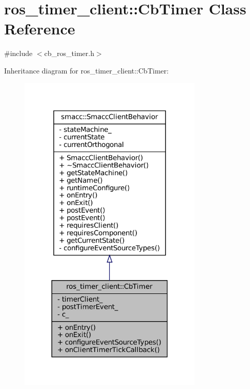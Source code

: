\hypertarget{classros__timer__client_1_1CbTimer}{}\section{ros\+\_\+timer\+\_\+client\+:\+:Cb\+Timer Class Reference}
\label{classros__timer__client_1_1CbTimer}


{\ttfamily \#include $<$cb\+\_\+ros\+\_\+timer.\+h$>$}



Inheritance diagram for ros\+\_\+timer\+\_\+client\+:\+:Cb\+Timer\+:
\nopagebreak
\begin{figure}[H]
\begin{center}
\leavevmode
\includegraphics[width=249pt]{classros__timer__client_1_1CbTimer__inherit__graph}
\end{center}
\end{figure}


